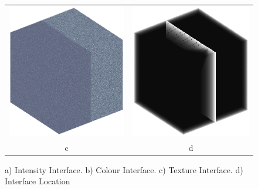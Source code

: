 \documentclass[9pt]{beamer}
\begin{document}
\begin{frame}
\begin{figure}
\begin{tabular}{c c}
						\includegraphics[scale=0.2]{statinterface} &
	
						\includegraphics[scale=0.2]{edge3d2}\\
						c & d
							
				\end{tabular}
						
						\caption{ a) Intensity Interface. b) Colour Interface. c) Texture Interface. d) Interface Location}
				\end{figure}
	
	\end{frame}
\end{document}
